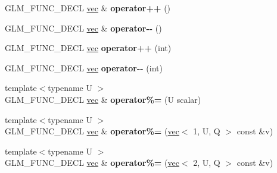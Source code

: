 \begin{DoxyCompactItemize}
G\+L\+M\+\_\+\+F\+U\+N\+C\+\_\+\+D\+E\+CL \hyperlink{structglm_1_1vec}{vec} \& {\bfseries operator++} ()
\item 
\mbox{\label{structglm_1_1vec_3_012_00_01T_00_01Q_01_4_a213bf05d1d3abd8ed5da4908cd3dfdd7}} 
G\+L\+M\+\_\+\+F\+U\+N\+C\+\_\+\+D\+E\+CL \hyperlink{structglm_1_1vec}{vec} \& {\bfseries operator-\/-\/} ()
\item 
\mbox{\label{structglm_1_1vec_3_012_00_01T_00_01Q_01_4_ab6bd7fc778f3585723da44341d9d5c37}} 
G\+L\+M\+\_\+\+F\+U\+N\+C\+\_\+\+D\+E\+CL \hyperlink{structglm_1_1vec}{vec} {\bfseries operator++} (int)
\item 
\mbox{\label{structglm_1_1vec_3_012_00_01T_00_01Q_01_4_a6017c4f43c83945ca60837ec727f4c43}} 
G\+L\+M\+\_\+\+F\+U\+N\+C\+\_\+\+D\+E\+CL \hyperlink{structglm_1_1vec}{vec} {\bfseries operator-\/-\/} (int)
\item 
\mbox{\label{structglm_1_1vec_3_012_00_01T_00_01Q_01_4_a56d5575c010ab98d5fd63852ecaf0bcc}} 
{\footnotesize template$<$typename U $>$ }\\G\+L\+M\+\_\+\+F\+U\+N\+C\+\_\+\+D\+E\+CL \hyperlink{structglm_1_1vec}{vec} \& {\bfseries operator\%=} (U scalar)
\item 
\mbox{\label{structglm_1_1vec_3_012_00_01T_00_01Q_01_4_a4e0dc1a7c70bbb39328fb5f31a5b9bf0}} 
{\footnotesize template$<$typename U $>$ }\\G\+L\+M\+\_\+\+F\+U\+N\+C\+\_\+\+D\+E\+CL \hyperlink{structglm_1_1vec}{vec} \& {\bfseries operator\%=} (\hyperlink{structglm_1_1vec}{vec}$<$ 1, U, Q $>$ const \&v)
\item 
\mbox{\label{structglm_1_1vec_3_012_00_01T_00_01Q_01_4_afd83c730132c6344a400715a0f82c846}} 
{\footnotesize template$<$typename U $>$ }\\G\+L\+M\+\_\+\+F\+U\+N\+C\+\_\+\+D\+E\+CL \hyperlink{structglm_1_1vec}{vec} \& {\bfseries operator\%=} (\hyperlink{structglm_1_1vec}{vec}$<$ 2, U, Q $>$ const \&v)
\item 
\mbox{\label{structglm_1_1vec_3_012_00_01T_00_01Q_01_4_a554ee3843af2a7997a63333ee475b8f8}} 

\end{DoxyCompactItemize}
